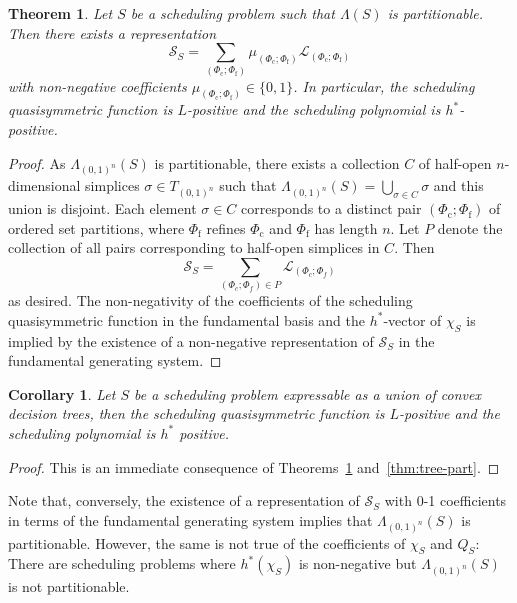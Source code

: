 \documentclass[12pt,reqno]{amsart}
\numberwithin{definition}{section}
\newtheorem{theorem}[definition]{Theorem}
\newtheorem{corollary}[definition]{Corollary}
\theoremstyle{definition}
\newcommand{\SSS}{\mathcal{S}}
\newcommand{\ncL}{\mathcal{L}}
\newcommand{\T}{T} %
\newcommand{\TC}{\T_{(0,1)^n}} %
\newcommand{\allow}{\Lambda} %
\newcommand{\poly}{\chi} %
\newcommand{\allowC}{\allow_{(0,1)^n}} %
\newcommand{\comment}[1]{\textsf{\footnotesize #1}}
\begin{document}


\begin{theorem}
\label{thm:part-pos}
Let $S$ be a scheduling problem such that $\allow(S)$ is partitionable. Then there exists a representation
\[
  \SSS_S = \sum_{(\Phi_\text{c};\Phi_\text{f})} \mu_{(\Phi_\text{c};\Phi_\text{f})} \ncL_{(\Phi_\text{c};\Phi_\text{f})}
\]
with non-negative coefficients $\mu_{(\Phi_\text{c};\Phi_\text{f})}\in \{0,1\}$. In particular, 
the scheduling quasisymmetric function is $L$-positive and the scheduling polynomial is $h^*$-positive.
\end{theorem}
\begin{proof}
As $\allowC(S)$ is partitionable, there exists a collection $C$ of half-open $n$-dimensional simplices $\sigma\in\TC$ such that $\allowC(S)=\bigcup_{\sigma\in C}\sigma$ and this union is disjoint. Each element $\sigma\in C$ corresponds to a distinct pair $(\Phi_\text{c};\Phi_\text{f})$ of ordered set partitions, where $\Phi_\text{f}$ refines $\Phi_\text{c}$ and $\Phi_\text{f}$ has length $n$. Let $P$ denote the collection of all pairs corresponding to half-open simplices in $C$. Then
\[
  \SSS_S = \sum_{(\Phi_c;\Phi_f)\in P} \ncL_{(\Phi_c;\Phi_f)}
\]
as desired. The non-negativity of the coefficients of the scheduling quasisymmetric function in the fundamental basis and the $h^*$-vector of $\poly_S$ is implied by the existence of a non-negative representation of $\SSS_S$ in the fundamental generating system.
\end{proof}

\begin{corollary}
Let $S$ be a scheduling problem expressable as a union of  convex decision trees, then the scheduling quasisymmetric function is $L$-positive and the scheduling polynomial is $h^*$ positive. 
\end{corollary}
\begin{proof}
This is an immediate consequence of Theorems~\ref{thm:part-pos} and~\ref{thm:tree-part}.
\end{proof}
Note that, conversely, the existence of a representation of $\SSS_S$ with 0-1 coefficients in terms of the fundamental generating system implies that $\allowC(S)$ is partitionable. However, the same is not true of the coefficients of $\poly_S$ and $Q_S$: There are scheduling problems where $h^*(\poly_S)$ is non-negative but $\allowC(S)$ is not partitionable. 
\end{document}
